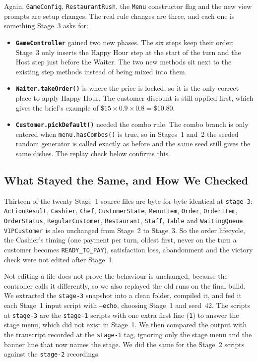 Again, \texttt{GameConfig}, \texttt{RestaurantRush}, the \texttt{Menu} constructor flag and the new view prompts are
setup changes. The real rule changes are three, and each one is something Stage~3 asks for:
\begin{itemize}[leftmargin=*]
\item \textbf{\texttt{GameController}} gained two new phases. The six steps keep their order; Stage~3 only inserts the
Happy Hour step at the start of the turn and the Host step just before the Waiter. The two new methods sit next to the
existing step methods instead of being mixed into them.
\item \textbf{\texttt{Waiter.takeOrder()}} is where the price is locked, so it is the only correct place to apply Happy Hour.
The customer discount is still applied first, which gives the brief's example of $\$15 \times 0.9 \times 0.8 = \$10.80$.
\item \textbf{\texttt{Customer.pickDefault()}} needed the combo rule. The combo branch is only entered when
\texttt{menu.hasCombos()} is true, so in Stages~1 and~2 the seeded random generator is called exactly as before and the
same seed still gives the same dishes. The replay check below confirms this.
\end{itemize}

\subsection{What Stayed the Same, and How We Checked}

Thirteen of the twenty Stage~1 source files are byte-for-byte identical at \texttt{stage-3}:
\texttt{ActionResult}, \texttt{Cashier}, \texttt{Chef}, \texttt{CustomerState}, \texttt{MenuItem}, \texttt{Order},
\texttt{OrderItem}, \texttt{OrderStatus}, \texttt{RegularCustomer}, \texttt{Restaurant}, \texttt{Staff}, \texttt{Table}
and \texttt{WaitingQueue}. \texttt{VIPCustomer} is also unchanged from Stage~2 to Stage~3. So the order lifecycle,
the Cashier's timing (one payment per turn, oldest first, never on the turn a customer becomes \texttt{READY\_TO\_PAY}),
satisfaction loss, abandonment and the victory check were not edited after Stage~1.

Not editing a file does not prove the behaviour is unchanged, because the controller calls it differently, so we also
replayed the old runs on the final build. We extracted the \texttt{stage-3} snapshot into a clean folder, compiled it,
and fed it each Stage~1 input script with \texttt{--echo}, choosing Stage~1 and seed~42. The scripts at \texttt{stage-3}
are the \texttt{stage-1} scripts with one extra first line (\texttt{1}) to answer the stage menu, which did not exist
in Stage~1. We then compared the output with the transcript recorded at the \texttt{stage-1} tag, ignoring only the
stage menu and the banner line that now names the stage. We did the same for the Stage~2 scripts against the
\texttt{stage-2} recordings.

